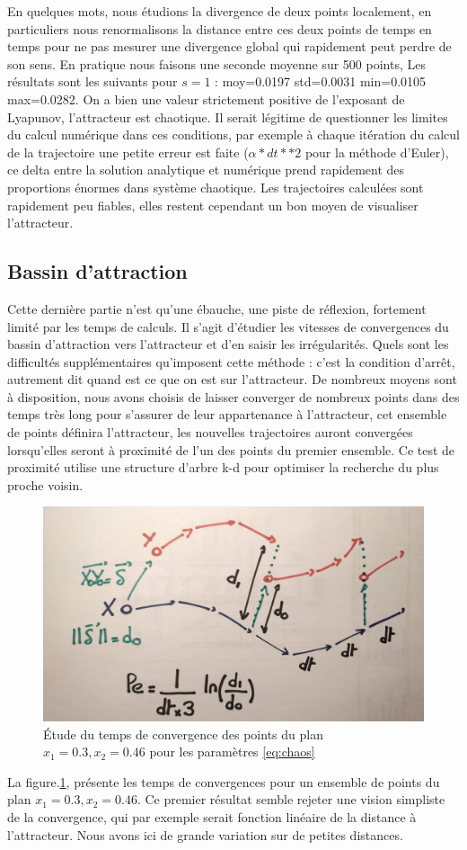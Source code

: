 \documentclass{wsdcr}
\begin{document}
En quelques mots, nous étudions la divergence de deux points localement, en particuliers nous renormalisons la distance entre ces deux points de temps en temps pour ne pas mesurer une divergence global qui rapidement peut perdre de son sens. En pratique nous faisons une seconde moyenne sur 500 points, Les résultats sont les suivants pour $s=1$ : moy=0.0197 std=0.0031 min=0.0105 max=0.0282. On a bien une valeur strictement positive de l'exposant de Lyapunov, l'attracteur est chaotique. Il serait légitime de questionner les limites du calcul numérique dans ces conditions, par exemple à chaque itération du calcul de la trajectoire une petite erreur est faite ($\alpha*dt**2$ pour la méthode d'Euler), ce delta entre la solution analytique et numérique prend rapidement des proportions énormes dans système chaotique. Les trajectoires calculées sont rapidement peu fiables, elles restent cependant un bon moyen de visualiser l'attracteur.
\subsection{Bassin d'attraction}
Cette dernière partie n'est qu'une ébauche, une piste de réflexion, fortement limité par les temps de calculs. Il s'agit d'étudier les vitesses de convergences du bassin d'attraction vers l'attracteur et d'en saisir les irrégularités. Quels sont les difficultés supplémentaires qu'imposent cette méthode : c'est la condition d'arrêt, autrement dit quand est ce que on est sur l'attracteur. De nombreux moyens sont à disposition, nous avons choisis de laisser converger de nombreux points dans des temps très long pour s'assurer de leur appartenance à l'attracteur, cet ensemble de points définira l'attracteur, les nouvelles trajectoires auront convergées lorsqu'elles seront à proximité de l'un des points du premier ensemble. Ce test de proximité utilise une structure d'arbre k-d pour optimiser la recherche du plus proche voisin.
\begin{figure}
    \centering
    \includegraphics[width=\linewidth]{fig/dessinLE.jpg}
    \caption{Étude du temps de convergence des points du plan $x_1=0.3,x_2=0.46$ pour les paramètres \ref{eq:chaos}}
    \label{fig:ba4}
\end{figure}
La figure.\ref{fig:ba4}, présente les temps de convergences pour un ensemble de points du plan $x_1=0.3,x_2=0.46$. Ce premier résultat semble rejeter une vision simpliste de la convergence, qui par exemple serait fonction linéaire de la distance à l'attracteur. Nous avons ici de grande variation sur de petites distances.
\end{document}
